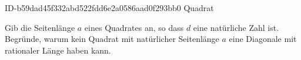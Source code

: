 \begin{exercise}
      {ID-b59dad45f332abd522fdd6e2a0586aad0f293bb0}
      {Quadrat}
  \ifproblem\problem\par
    \begin{minipage}[c]{0.24\linewidth}
      \centering
    \end{minipage}\hfill
    \begin{minipage}[c]{0.75\linewidth}
      Gib die Seitenlänge $a$ eines Quadrates an, so dass $d$ eine
      natürliche Zahl ist. Begründe, warum kein Quadrat mit natürlicher
      Seitenlänge $a$ eine Diagonale mit rationaler Länge haben kann.
    \end{minipage}
  \fi
\end{exercise}
